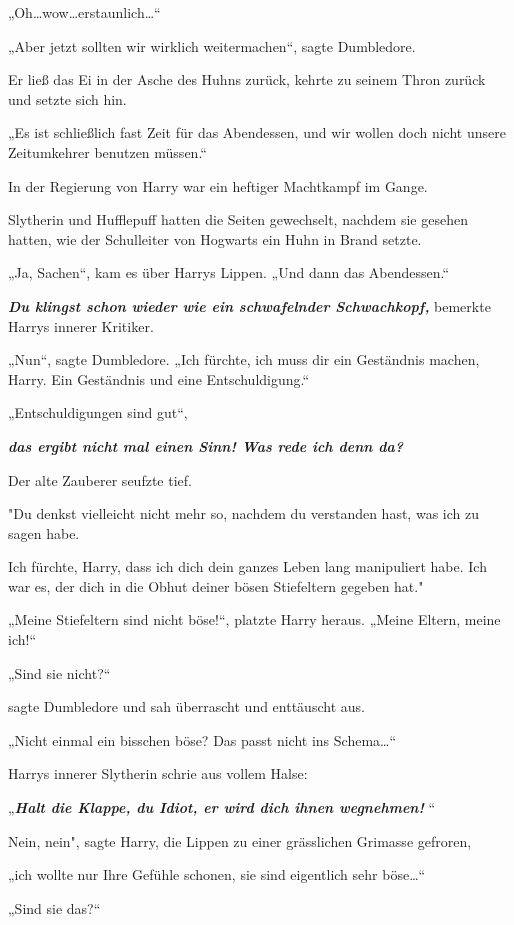 {„Oh…wow…erstaunlich…“

„Aber jetzt sollten wir wirklich weitermachen“, sagte Dumbledore.

Er ließ das Ei in der Asche des Huhns zurück, kehrte zu seinem Thron zurück und setzte sich hin.

„Es ist schließlich fast Zeit für das Abendessen, und wir wollen doch nicht unsere Zeitumkehrer benutzen müssen.“

In der Regierung von Harry war ein heftiger Machtkampf im Gange.

Slytherin und Hufflepuff hatten die Seiten gewechselt, nachdem sie gesehen hatten, wie der Schulleiter von Hogwarts ein Huhn in Brand setzte.

„Ja, Sachen“, kam es über Harrys Lippen. „Und dann das Abendessen.“

\textbf{\emph{Du klingst schon wieder wie ein schwafelnder Schwachkopf,}} bemerkte Harrys innerer Kritiker.

„Nun“, sagte Dumbledore. „Ich fürchte, ich muss dir ein Geständnis machen, Harry. Ein Geständnis und eine Entschuldigung.“

„Entschuldigungen sind gut“,

\textbf{\emph{das ergibt nicht mal einen Sinn! Was rede ich denn da?}}

Der alte Zauberer seufzte tief.

"Du denkst vielleicht nicht mehr so, nachdem du verstanden hast, was ich zu sagen habe.

Ich fürchte, Harry, dass ich dich dein ganzes Leben lang manipuliert habe. Ich war es, der dich in die Obhut deiner bösen Stiefeltern gegeben hat."

„Meine Stiefeltern sind nicht böse!“, platzte Harry heraus. „Meine Eltern, meine ich!“

„Sind sie nicht?“

sagte Dumbledore und sah überrascht und enttäuscht aus.

„Nicht einmal ein bisschen böse? Das passt nicht ins Schema…“

Harrys innerer Slytherin schrie aus vollem Halse:

„\textbf{\emph{Halt die Klappe, du Idiot, er wird dich ihnen wegnehmen!}} “

Nein, nein", sagte Harry, die Lippen zu einer grässlichen Grimasse gefroren,

„ich wollte nur Ihre Gefühle schonen, sie sind eigentlich sehr böse…“

„Sind sie das?“

}
